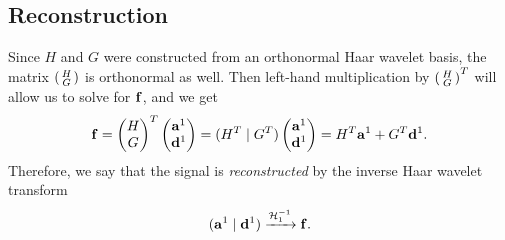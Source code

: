 \documentclass[12pt]{article}
\theoremstyle{definition}
\begin{document}
  \subsection{Reconstruction}
  Since \(H\) and \(G\) were constructed from an orthonormal Haar wavelet basis, the matrix \(\smqty(H \\ G)\) is orthonormal as well. Then left-hand multiplication by \(\smqty(H \\ G)^T\) will allow us to solve for \(\vb{f}\), and we get
  \begin{equation}
    \vb{f} =
    \begin{pmatrix}
      H \\ G
    \end{pmatrix}^T
    \begin{pmatrix}
      \vb{a}^1 \\ \vb{d}^1
    \end{pmatrix} =
      (H^T \mid G^T)
    \begin{pmatrix}
      \vb{a}^1 \\ \vb{d}^1
    \end{pmatrix} =
    H^T \vb{a}^1 + G^T \vb{d}^1.
  \end{equation}
  Therefore, we say that the signal is \textit{reconstructed} by the inverse Haar wavelet transform
  \begin{equation}
    (\vb{a}^1 \mid \vb{d}^1)  \xrightarrow{\mathcal{H}^{-1}_1} \vb{f}.
  \end{equation}
\end{document}
